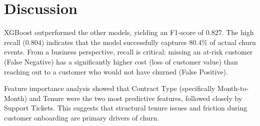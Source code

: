 \section{Discussion}
XGBoost outperformed the other models, yielding an F1-score of $0.827$. The high recall ($0.804$) indicates that the model successfully captures $80.4\%$ of actual churn events. From a business perspective, recall is critical: missing an at-risk customer (False Negative) has a significantly higher cost (loss of customer value) than reaching out to a customer who would not have churned (False Positive).

Feature importance analysis showed that Contract Type (specifically Month-to-Month) and Tenure were the two most predictive features, followed closely by Support Tickets. This suggests that structural tenure issues and friction during customer onboarding are primary drivers of churn.
